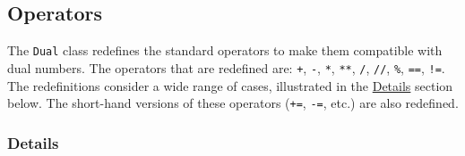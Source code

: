 \documentclass[a4paper,12pt]{article}
\begin{document}
\subsection{Operators}
\label{sec:part3}

The \texttt{Dual} class redefines the standard operators to make them compatible with dual numbers. The operators that are redefined are: \texttt{+}, \texttt{-}, \texttt{*}, \texttt{**}, \texttt{/}, \texttt{//}, \texttt{\%}, \texttt{==}, \texttt{!=}. The redefinitions consider a wide range of cases, illustrated in the \hyperref[sec:details]{Details} section below.
The short-hand versions of these operators (\texttt{+=}, \texttt{-=}, etc.) are also redefined.

\subsubsection{Details}
\label{sec:details}
\end{document}
